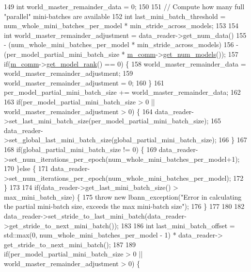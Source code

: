 \begin{DoxyCode}
149   \textcolor{keywordtype}{int} world\_master\_remainder\_data = 0;
150 
151   \textcolor{comment}{// Compute how many full "parallel" mini-batches are available}
152   \textcolor{keywordtype}{int} last\_mini\_batch\_threshold = num\_whole\_mini\_batches\_per\_model * min\_stride\_across\_models;
153 
154   \textcolor{keywordtype}{int} world\_master\_remainder\_adjustment = data\_reader->get\_num\_data()
155                                           - (num\_whole\_mini\_batches\_per\_model * min\_stride\_across\_models)
156                                           - (per\_model\_partial\_mini\_batch\_size * 
      \hyperlink{classlbann_1_1generic__io__buffer_a2e4a46c85c8b30e10b1cc5acaa2c4cca}{m\_comm}->\hyperlink{classlbann_1_1lbann__comm_aeb8ef8f13bbb324e3e1f656998198f3f}{get\_num\_models}());
157   \textcolor{keywordflow}{if}(\hyperlink{classlbann_1_1generic__io__buffer_a2e4a46c85c8b30e10b1cc5acaa2c4cca}{m\_comm}->\hyperlink{classlbann_1_1lbann__comm_a6422f70c92bed0b78179facc52b066f7}{get\_model\_rank}() == 0) \{
158     world\_master\_remainder\_data = world\_master\_remainder\_adjustment;
159     world\_master\_remainder\_adjustment = 0;
160   \}
161   per\_model\_partial\_mini\_batch\_size += world\_master\_remainder\_data;
162 
163   \textcolor{keywordflow}{if}(per\_model\_partial\_mini\_batch\_size > 0 || world\_master\_remainder\_adjustment > 0) \{
164     data\_reader->set\_last\_mini\_batch\_size(per\_model\_partial\_mini\_batch\_size);
165     data\_reader->set\_global\_last\_mini\_batch\_size(global\_partial\_mini\_batch\_size);
166   \}
167 
168   \textcolor{keywordflow}{if}(global\_partial\_mini\_batch\_size != 0) \{
169     data\_reader->set\_num\_iterations\_per\_epoch(num\_whole\_mini\_batches\_per\_model+1);
170   \}\textcolor{keywordflow}{else} \{
171     data\_reader->set\_num\_iterations\_per\_epoch(num\_whole\_mini\_batches\_per\_model);
172   \}
173 
174   \textcolor{keywordflow}{if}(data\_reader->get\_last\_mini\_batch\_size() > max\_mini\_batch\_size) \{
175     \textcolor{keywordflow}{throw} \textcolor{keyword}{new} lbann\_exception(\textcolor{stringliteral}{"Error in calculating the partial mini-batch size, exceeds the max mini-batch
       size"});
176   \}
177 
180 
182   data\_reader->set\_stride\_to\_last\_mini\_batch(data\_reader->get\_stride\_to\_next\_mini\_batch());
183 
186   \textcolor{keywordtype}{int} last\_mini\_batch\_offset = std::max(0, num\_whole\_mini\_batches\_per\_model - 1) * data\_reader->
      get\_stride\_to\_next\_mini\_batch();
187 
189   \textcolor{keywordflow}{if}(per\_model\_partial\_mini\_batch\_size > 0 || world\_master\_remainder\_adjustment > 0) \{

\end{DoxyCode}
